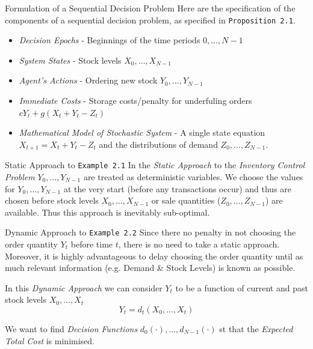 \documentclass[11pt,a4paper]{article}
\begin{document}
  \begin{proposition}{Formulation of a Sequential Decision Problem}
    Here are the specification of the components of a sequential decision problem, as specified in \texttt{Proposition 2.1}.
    \begin{itemize}
      \item \textit{Decision Epochs} - Beginnings of the time periods $0,\dots,N-1$
      \item \textit{System States} - Stock levels $X_0,\dots,X_{N-1}$
      \item \textit{Agent's Actions} - Ordering new stock $Y_0,\dots,Y_{N-1}$
      \item \textit{Immediate Costs} - Storage costs/penalty for underfuling orders $cY_t+g(X_t+Y_t-Z_t)$
      \item \textit{Mathematical Model of Stochastic System} - A single state equation $X_{t+1}=X_t+Y_t-Z_t$ and the distributions of demand $Z_0,\dots,Z_{N-1}$.
    \end{itemize}
  \end{proposition}

  \begin{proposition}{Static Approach to \texttt{Example 2.1}}
    In the \textit{Static Approach} to the \textit{Inventory Control Problem} $Y_0,\dots,Y_{N-1}$ are treated as deterministic variables. We choose the values for $Y_0,\dots,Y_{N-1}$ at the very start (before any transactions occur) and thus are chosen before stock levels $X_0,\dots,X_{N-1}$ or sale quantities ($Z_0,\dots,Z_{N-1}$) are available. Thus this approach is inevitably sub-optimal.
  \end{proposition}

  \begin{proposition}{Dynamic Approach to \texttt{Example 2.2}}
    Since there no penalty in not choosing the order quantity $Y_t$ before time $t$, there is no need to take a static approach. Moreover, it is highly advantageous to delay choosing the order quantity until as much relevant information (e.g. Demand \& Stock Levels) is known as possible.
    \par In this \textit{Dynamic Approach} we can consider $Y_t$ to be a function of current and past stock levels $X_0,\dots,X_t$
    \[ Y_t=d_t(X_0,\dots,X_t) \]
    \par We want to find \textit{Decision Functions} $d_0(\cdot),\dots,d_{N-1}(\cdot)$ st that the \textit{Expected Total Cost} is minimised.
  \end{proposition}
\end{document}
